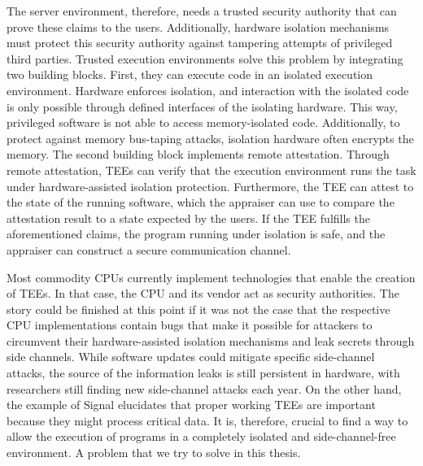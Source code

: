 The server environment, therefore, needs a trusted security authority that can
prove these claims to the users. Additionally, hardware isolation mechanisms
must protect this security authority against tampering attempts of privileged
third parties. Trusted execution environments solve this problem by integrating
two building blocks. First, they can execute code in an isolated execution
environment. Hardware enforces isolation, and interaction with the isolated code
is only possible through defined interfaces of the isolating hardware. This way,
privileged software is not able to access memory-isolated code. Additionally, to
protect against memory bus-taping attacks, isolation hardware often encrypts the
memory. The second building block implements remote attestation. Through remote
attestation, TEEs can verify that the execution environment runs the task under
hardware-assisted isolation protection. Furthermore, the TEE can attest to the
state of the running software, which the appraiser can use to compare the
attestation result to a state expected by the users. If the TEE fulfills the
aforementioned claims, the program running under isolation is safe, and the
appraiser can construct a secure communication channel.

Most commodity CPUs currently implement technologies that enable the creation of
TEEs. In that case, the CPU and its vendor act as security
authorities.\cite{tdx_whitepaper,kaplan_amd_2020,pinto_demystifying_2019,costan2016intel}
The story could be finished at this point if it was not the case that the
respective CPU implementations contain bugs that make it possible for attackers
to circumvent their hardware-assisted isolation mechanisms and leak secrets
through side
channels.\cite{kocher_spectre_2020,lipp_meltdown_2020,nilsson_survey_2020} While
software updates could mitigate specific side-channel attacks, the source of the
information leaks is still persistent in hardware, with researchers still
finding new side-channel attacks each
year.\cite{wikner2022retbleed,moghimi_downfall_2023,ragab_ghostrace_2024} On the
other hand, the example of Signal elucidates that proper working TEEs are
important because they might process critical data. It is, therefore, crucial to
find a way to allow the execution of programs in a completely isolated and
side-channel-free environment. A problem that we try to solve in this thesis.
